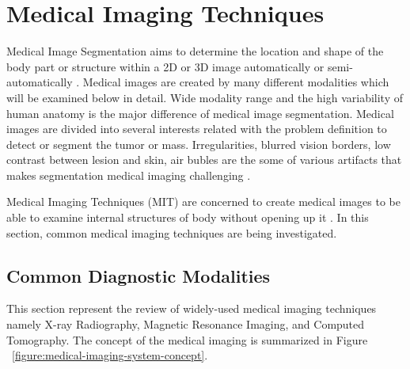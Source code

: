 \section{Medical Imaging Techniques}

    Medical Image Segmentation aims to determine the location and shape of the body part or structure within a 2D or 3D image automatically or semi-automatically \cite{merjulah2019classification}.
    Medical images are created by many different modalities which will be examined below in detail.
    Wide modality range and the high variability of human anatomy is the major difference of medical image segmentation.
    Medical images are divided into several interests related with the problem definition to detect or segment the tumor or mass.
    Irregularities, blurred vision borders, low contrast between lesion and skin, air bubles are the some of various artifacts that makes segmentation medical imaging challenging \cite{guo2019neutrosophic}.

    Medical Imaging Techniques (MIT) are concerned to create medical images to be able to examine internal structures of body without opening up it \cite{kasban2015comparative}.
    In this section, common medical imaging techniques are being investigated.

    \subsection{Common Diagnostic Modalities}

        

        This section represent the review of widely-used medical imaging techniques namely X-ray Radiography, Magnetic Resonance Imaging, and Computed Tomography.
        The concept of the medical imaging is summarized in Figure ~\ref{figure:medical-imaging-system-concept}.

